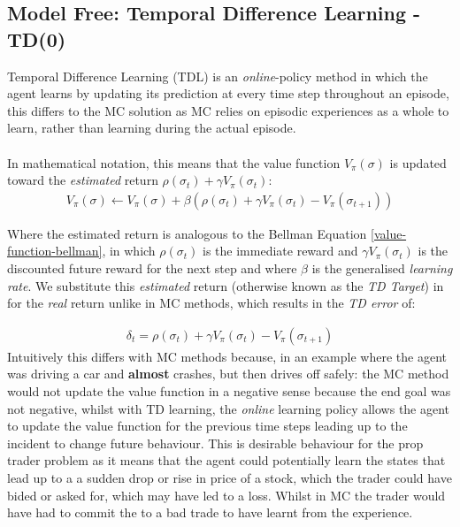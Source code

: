 \documentclass[ %
                    author={Ashwinder Khurana},
                supervisor={Prof Dave Cliff},
                    degree={MEng},
                     title={The Deeply Reinforced Trader},
                  subtitle={},
                      type={enterprise},
                      year={2020} ]{dissertation}
\begin{document}
{\subsection{Model Free: Temporal Difference Learning - TD(0)}
\label{TD learning}
Temporal Difference Learning (TDL) is an \textit{online}-policy method in which the agent learns by updating its prediction at every time step throughout an episode, this differs to the MC solution as MC relies on episodic experiences as a whole to learn, rather than learning during the actual episode.  
\\
\\
In mathematical notation, this means that the value function $V_\pi(\sigma)$ is updated toward the \textit{estimated} return $\rho(\sigma_t) + \gamma V_\pi (\sigma_t)$:
\begin{equation}
\label{TD error}
\begin{split}
V_\pi(\sigma) \leftarrow V_\pi(\sigma) + \beta(\rho(\sigma_t) + \gamma V_\pi (\sigma_t) - V_\pi(\sigma_{t+1}))
\end{split}
\end{equation}

Where the estimated return is analogous to the Bellman Equation \ref{value-function-bellman}, in which $\rho(\sigma_t)$ is the immediate reward and $\gamma V_\pi(\sigma_t)$ is the discounted future reward for the next step and where $\beta$ is the generalised \textit{learning rate}. We substitute this \textit{estimated} return (otherwise known as the \textit{TD Target}) in for the \textit{real} return unlike in MC methods, which results in the \textit{TD error} of:

\begin{equation}
\label{TD error}
\begin{split}
\delta_t = \rho(\sigma_t) + \gamma V_\pi (\sigma_t) - V_\pi(\sigma_{t+1})
\end{split}
\end{equation}
\noindent
Intuitively this differs with MC methods because, in an example where the agent was driving a car and \textbf{almost} crashes, but then drives off safely: the MC method would not update the value function in a negative sense because the end goal was not negative, whilst with TD learning, the \textit{online} learning policy allows the agent to update the value function for the previous time steps leading up to the incident to change future behaviour. This is desirable behaviour for the prop trader problem as it means that the agent could potentially learn the states that lead up to a a sudden drop or rise in price of a stock, which the trader could have bided or asked for, which may have led to a loss. Whilst in MC the trader would have had to commit the to a bad trade to have learnt from the experience. 
\\
\\

}
\end{document}

